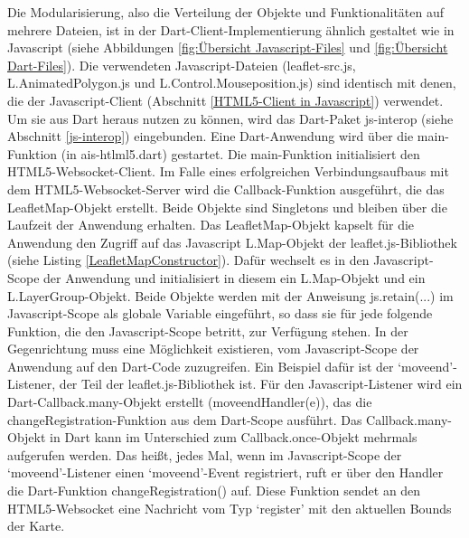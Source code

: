 Die Modularisierung, also die Verteilung der Objekte und Funktionalitäten auf mehrere Dateien, ist in der Dart-Client-Implementierung ähnlich gestaltet wie in Javascript (siehe Abbildungen  \ref{fig:Übersicht Javascript-Files} und \ref{fig:Übersicht Dart-Files}). Die verwendeten Javascript-Dateien (leaflet-src.js, L.AnimatedPolygon.js und L.Control.Mouseposition.js) sind identisch mit denen, die der Javascript-Client (Abschnitt \ref{HTML5-Client in Javascript}) verwendet. Um sie aus Dart heraus nutzen zu können, wird das Dart-Paket js-interop (siehe Abschnitt \ref{js-interop}) eingebunden.
Eine Dart-Anwendung wird über die main-Funktion (in ais-htlml5.dart) gestartet. Die main-Funktion initialisiert den HTML5-Websocket-Client. Im Falle eines erfolgreichen Verbindungsaufbaus mit dem HTML5-Websocket-Server wird die Callback-Funktion ausgeführt, die das LeafletMap-Objekt erstellt. Beide Objekte sind Singletons und bleiben über die Laufzeit der Anwendung erhalten.
Das LeafletMap-Objekt kapselt für die Anwendung den Zugriff auf das Javascript L.Map-Objekt der leaflet.js-Bibliothek (siehe Listing \ref{LeafletMapConstructor}). Dafür wechselt es in den Javascript-Scope der Anwendung und initialisiert in diesem ein L.Map-Objekt und ein L.LayerGroup-Objekt. Beide Objekte werden mit der Anweisung js.retain(...) im Javascript-Scope als globale Variable eingeführt, so dass sie für jede folgende Funktion, die den Javascript-Scope betritt, zur Verfügung stehen.
In der Gegenrichtung muss eine Möglichkeit existieren, vom Javascript-Scope der Anwendung auf den Dart-Code zuzugreifen. Ein Beispiel dafür ist der ‘moveend’-Listener, der Teil der leaflet.js-Bibliothek ist. Für den Javascript-Listener wird ein Dart-Callback.many-Objekt erstellt (moveendHandler(e)), das die changeRegistration-Funktion aus dem Dart-Scope ausführt. Das Callback.many-Objekt in Dart kann im Unterschied zum Callback.once-Objekt mehrmals aufgerufen werden. Das heißt, jedes Mal, wenn im Javascript-Scope der  ‘moveend’-Listener einen  ‘moveend’-Event registriert, ruft er über den Handler die Dart-Funktion changeRegistration() auf. Diese Funktion sendet an den HTML5-Websocket eine Nachricht vom Typ ‘register’ mit den aktuellen Bounds der Karte.

